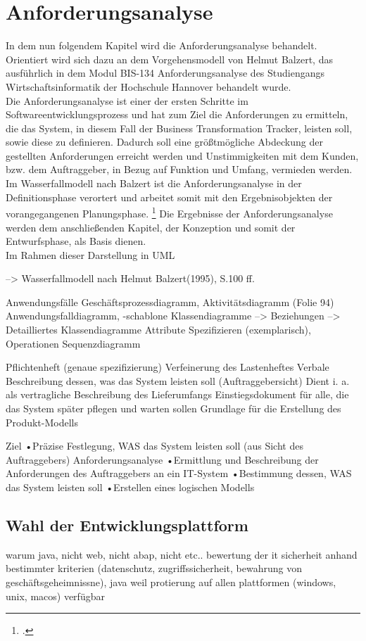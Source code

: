 \section{Anforderungsanalyse}
In dem nun folgendem Kapitel wird die Anforderungsanalyse behandelt. Orientiert wird sich dazu an dem Vorgehensmodell von Helmut Balzert, das ausführlich in dem Modul BIS-134 Anforderungsanalyse des Studiengangs Wirtschaftsinformatik der Hochschule Hannover behandelt wurde.\\Die Anforderungsanalyse ist einer der ersten Schritte im Softwareentwicklungsprozess und hat zum Ziel die Anforderungen zu ermitteln, die das System, in diesem Fall der Business Transformation Tracker, leisten soll, sowie diese zu definieren. Dadurch soll eine größtmögliche Abdeckung der gestellten Anforderungen erreicht werden und Unstimmigkeiten mit dem Kunden, bzw. dem Auftraggeber, in Bezug auf Funktion und Umfang, vermieden werden. Im Wasserfallmodell nach Balzert ist die Anforderungsanalyse in der Definitionsphase verortert und arbeitet somit mit den Ergebnisobjekten der vorangegangenen Planungsphase. \footcite[Vgl.][S. 100 ff.]{balzert} Die Ergebnisse der Anforderungsanalyse werden dem anschließenden Kapitel, der Konzeption und somit der Entwurfsphase, als Basis dienen.\\
Im Rahmen dieser    Darstellung in UML


--> Wasserfallmodell nach Helmut Balzert(1995), S.100 ff.

Anwendungsfälle
Geschäftsprozessdiagramm, Aktivitätsdiagramm (Folie 94)
Anwendungsfalldiagramm, -schablone
Klassendiagramme --> Beziehungen --> Detailliertes Klassendiagramme
Attribute Spezifizieren (exemplarisch), Operationen
Sequenzdiagramm

Pflichtenheft (genaue spezifizierung) 
Verfeinerung des Lastenheftes
Verbale Beschreibung dessen, was das System leisten soll (Auftraggebersicht)
Dient i. a. als vertragliche Beschreibung des Lieferumfangs
Einstiegsdokument für alle, die das System später pflegen und warten sollen
Grundlage für die Erstellung des Produkt-Modells

Ziel
•Präzise Festlegung, WAS das System leisten soll (aus Sicht des Auftraggebers)
Anforderungsanalyse
•Ermittlung und Beschreibung der Anforderungen des Auftraggebers an ein IT-System
•Bestimmung dessen, WAS das System leisten soll
•Erstellen eines logischen Modells

\subsection{Wahl der Entwicklungsplattform}
warum java, nicht web, nicht abap, nicht etc..
bewertung der it sicherheit anhand bestimmter kriterien (datenschutz, zugriffssicherheit, bewahrung von geschäftsgeheimnissne), java weil protierung auf allen plattformen (windows, unix, macos) verfügbar

